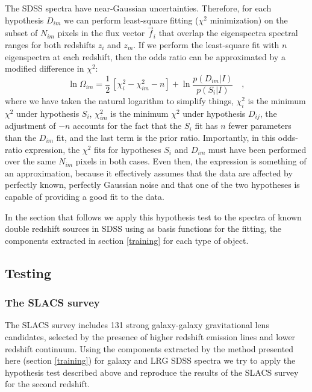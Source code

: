 \documentclass[12pt,preprint]{aastex}
\begin{document}
The SDSS spectra have near-Gaussian uncertainties. Therefore, for each hypothesis $D_{im}$ we can perform least-square fitting ($\chi^2$ minimization) on the subset of $N_{im}$ pixels in the flux vector $\vec{f}_i$ that overlap the eigenspectra spectral ranges for both redshifts $z_i$ and $z_m$.  If we perform the least-square fit with $n$ eigenspectra at each redshift, then the odds ratio can be approximated by a modified difference in $\chi^2$:
\begin{equation}
\ln\Omega_{im}= \frac{1}{2}\,\left[\chi^2_i-\chi^2_{im}-n\right]
 +\ln\frac{p(D_{im}|I)}{p(S_i|I)} \quad,
\end{equation}
where we have taken the natural logarithm to simplify things, $\chi^2_i$ is the minimum $\chi^2$ under hypothesis $S_i$, $\chi^2_{im}$ is the minimum $\chi^2$ under hypothesis $D_{ij}$, the adjustment of $-n$ accounts for the fact that the $S_i$ fit has $n$ fewer parameters than the $D_{im}$ fit, and the last term is the prior ratio. Importantly, in this odds-ratio expression, the $\chi^2$ fits
for hypotheses $S_i$ and $D_{im}$ must have been performed over the same $N_{im}$ pixels in both cases. Even then, the expression is
something of an approximation, because it effectively assumes that the data are affected by perfectly known, perfectly Gaussian noise and
that one of the two hypotheses is capable of providing a good fit to the data.

In the section that follows we apply this hypothesis test to the spectra of known double redshift sources in SDSS using as basis functions for the fitting, the components extracted in section \ref{training} for each type of object.

\subsection{Testing}\label{testing}

\subsubsection{The SLACS survey}\label{slacs}
The SLACS survey \citep{bolton} includes 131 strong galaxy-galaxy gravitational lens candidates, selected by the presence of higher redshift emission lines and lower redshift continuum. Using the components extracted by the method presented here (section \ref{training}) for galaxy and LRG SDSS spectra we try to apply the hypothesis test described above and reproduce the results of the SLACS survey for the second redshift.
\end{document}
